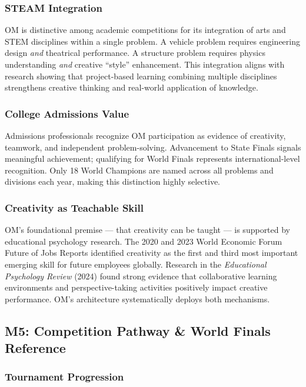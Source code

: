 \documentclass[11pt,letterpaper]{article}
\begin{document}
\subsubsection{STEAM Integration}

OM is distinctive among academic competitions for its integration of arts and STEM disciplines within a single problem. A vehicle problem requires engineering design \emph{and} theatrical performance. A structure problem requires physics understanding \emph{and} creative ``style'' enhancement. This integration aligns with research showing that project-based learning combining multiple disciplines strengthens creative thinking and real-world application of knowledge.

\subsubsection{College Admissions Value}

Admissions professionals recognize OM participation as evidence of creativity, teamwork, and independent problem-solving. Advancement to State Finals signals meaningful achievement; qualifying for World Finals represents international-level recognition. Only 18 World Champions are named across all problems and divisions each year, making this distinction highly selective.

\subsubsection{Creativity as Teachable Skill}

OM's foundational premise --- that creativity can be taught --- is supported by educational psychology research. The 2020 and 2023 World Economic Forum Future of Jobs Reports identified creativity as the first and third most important emerging skill for future employees globally. Research in the \emph{Educational Psychology Review} (2024) found strong evidence that collaborative learning environments and perspective-taking activities positively impact creative performance. OM's architecture systematically deploys both mechanisms.

\subsection{M5: Competition Pathway \& World Finals Reference}

\subsubsection{Tournament Progression}
\end{document}
